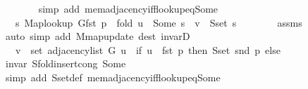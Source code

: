 \begin{isabellebody}
\ \ \ \ \ \ \isamarkupfalse%
\ {\isacharparenleft}{\kern0pt}simp\ add{\isacharcolon}{\kern0pt}\ mem{\isacharunderscore}{\kern0pt}adjacency{\isacharunderscore}{\kern0pt}iff{\isacharunderscore}{\kern0pt}lookup{\isacharunderscore}{\kern0pt}eq{\isacharunderscore}{\kern0pt}Some{\isacharparenright}{\kern0pt}\isanewline
\ \ \ \ \isamarkupfalse%
\ \isamarkupfalse%
\ {\isachardoublequoteopen}{\isachardot}{\kern0pt}{\isachardot}{\kern0pt}{\isachardot}{\kern0pt}\ {\isasymlongleftrightarrow}\ {\isacharparenleft}{\kern0pt}{\isasymexists}s{\isachardot}{\kern0pt}\ {\isacharparenleft}{\kern0pt}Map{\isacharunderscore}{\kern0pt}lookup\ G{\isacharparenleft}{\kern0pt}fst\ p\ {\isasymmapsto}\ {\isacharquery}{\kern0pt}fold{\isacharparenright}{\kern0pt}{\isacharparenright}{\kern0pt}\ u\ {\isacharequal}{\kern0pt}\ Some\ s\ {\isasymand}\ v\ {\isasymin}\ S{\isachardot}{\kern0pt}set\ s{\isacharparenright}{\kern0pt}{\isachardoublequoteclose}\isanewline
\ \ \ \ \ \ \isamarkupfalse%
\ assms{\isacharparenleft}{\kern0pt}{}{\isacharparenright}{\kern0pt}\isanewline
\ \ \ \ \ \ \isamarkupfalse%
\ {\isacharparenleft}{\kern0pt}auto\ simp\ add{\isacharcolon}{\kern0pt}\ M{\isachardot}{\kern0pt}map{\isacharunderscore}{\kern0pt}update\ dest{\isacharcolon}{\kern0pt}\ invarD{\isacharparenleft}{\kern0pt}{}{\isacharparenright}{\kern0pt}{\isacharparenright}{\kern0pt}\isanewline
\ \ \ \ \isamarkupfalse%
\ \isamarkupfalse%
\ {\isachardoublequoteopen}{\isachardot}{\kern0pt}{\isachardot}{\kern0pt}{\isachardot}{\kern0pt}\ {\isasymlongleftrightarrow}\ v\ {\isasymin}\ set\ {\isacharparenleft}{\kern0pt}adjacency{\isacharunderscore}{\kern0pt}list\ G\ u{\isacharparenright}{\kern0pt}\ {\isasymunion}\ {\isacharparenleft}{\kern0pt}if\ u\ {\isacharequal}{\kern0pt}\ fst\ p\ then\ S{\isachardot}{\kern0pt}set\ {\isacharparenleft}{\kern0pt}snd\ p{\isacharparenright}{\kern0pt}\ else\ {\isacharbraceleft}{\kern0pt}{\isacharbraceright}{\kern0pt}{\isacharparenright}{\kern0pt}{\isachardoublequoteclose}\isanewline
\ \ \ \ \ \ \isamarkupfalse%
\ invar\ S{\isachardot}{\kern0pt}fold{\isacharunderscore}{\kern0pt}insert{\isacharunderscore}{\kern0pt}cong\ Some\isanewline
\ \ \ \ \ \ \isamarkupfalse%
\ {\isacharparenleft}{\kern0pt}simp\ add{\isacharcolon}{\kern0pt}\ S{\isachardot}{\kern0pt}set{\isacharunderscore}{\kern0pt}def\ mem{\isacharunderscore}{\kern0pt}adjacency{\isacharunderscore}{\kern0pt}iff{\isacharunderscore}{\kern0pt}lookup{\isacharunderscore}{\kern0pt}eq{\isacharunderscore}{\kern0pt}Some{\isacharparenright}{\kern0pt}\isanewline

\end{isabellebody}

